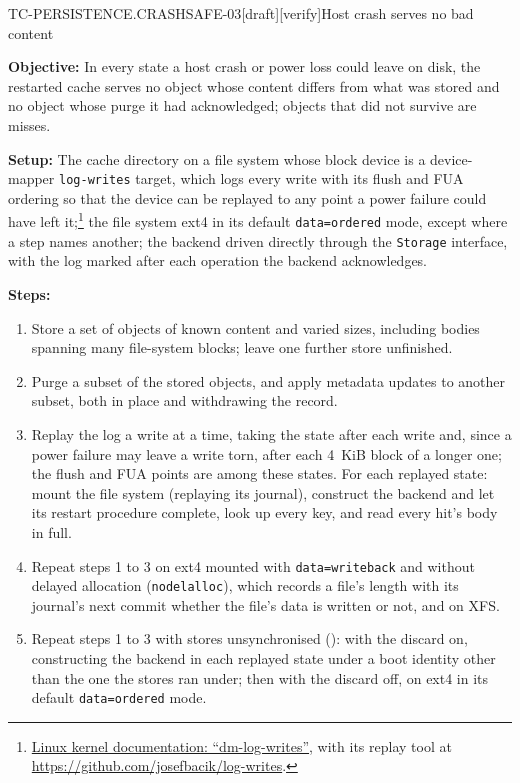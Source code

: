 \begin{requirement}{TC-PERSISTENCE.CRASHSAFE-03}[draft][verify]{Host crash serves no bad content}


  \textbf{Objective:} In every state a host crash or power loss could leave on
  disk, the restarted cache serves no object whose content differs from what
  was stored and no object whose purge it had acknowledged; objects that did
  not survive are misses.

  \textbf{Setup:} The cache directory on a file system whose block device is a
  device-mapper \texttt{log-writes} target, which logs every write with its
  flush and FUA ordering so that the device can be replayed to any point a power
  failure could have left it;\footnote{\href{https://docs.kernel.org/admin-guide/device-mapper/log-writes.html}{Linux
  kernel documentation: ``dm-log-writes''}, with its replay tool at
  \url{https://github.com/josefbacik/log-writes}.} the file system ext4 in its
  default \texttt{data=ordered} mode, except where a step names another; the
  backend driven directly through the \texttt{Storage} interface, with the log
  marked after each operation the backend acknowledges.

  \textbf{Steps:}
  \begin{enumerate}
    \item Store a set of objects of known content and varied sizes, including
      bodies spanning many file-system blocks; leave one further store
      unfinished.
    \item Purge a subset of the stored objects, and apply metadata updates to
      another subset, both in place and withdrawing the record.
    \item Replay the log a write at a time, taking the state after each write
      and, since a power failure may leave a write torn, after each 4~KiB
      block of a longer one; the flush and FUA points are among these
      states. For each replayed state: mount the file system (replaying its
      journal), construct the backend and let its restart procedure
      complete, look up every key, and read every hit's body in full.
    \item Repeat steps 1 to 3 on ext4 mounted with \texttt{data=writeback}
      and without delayed allocation (\texttt{nodelalloc}), which records a
      file's length with its journal's next commit whether the file's data
      is written or not, and on XFS.
    \item Repeat steps 1 to 3 with stores unsynchronised
      (): with the discard on,
      constructing the backend in each replayed state under a boot identity
      other than the one the stores ran under; then with the discard off, on
      ext4 in its default \texttt{data=ordered} mode.
  \end{enumerate}


\end{requirement}
